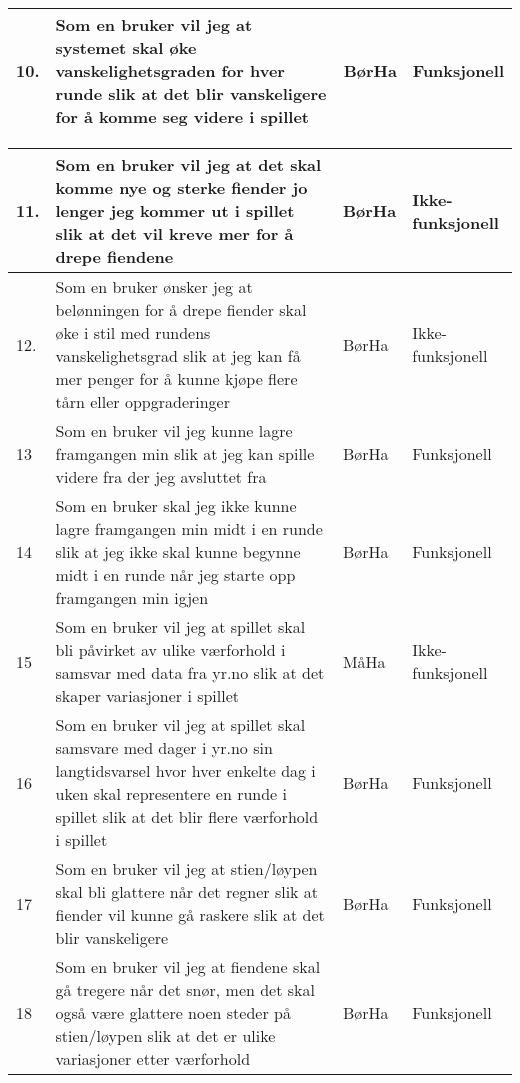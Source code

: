 \documentclass[norsk,a4paper,fontsize=11]{article}
\begin{document}
\begin{center}
\begin{tabular}{|m{} | m{} | m{2cm} | m{3cm} |}
    10. & Som en bruker vil jeg at systemet skal øke vanskelighetsgraden for hver runde slik at det blir vanskeligere for å komme seg videre i spillet & BørHa & Funksjonell \\ \hline
   
    
    
\end{tabular}

\begin{tabular}{|m{} | m{} | m{2cm} | m{3cm} |}
    \hline   
    
   	   11. & Som en bruker vil jeg at det skal komme nye og sterke fiender jo lenger jeg kommer ut i spillet slik at det vil kreve mer for å drepe fiendene & BørHa & Ikke-funksjonell
    \\ \hline
     
    12. & Som en bruker ønsker jeg at belønningen for å drepe fiender skal øke i stil med rundens vanskelighetsgrad slik at jeg kan få mer penger for å kunne kjøpe flere tårn eller oppgraderinger & BørHa & Ikke-funksjonell \\
    \hline
    
    13 & Som en bruker vil jeg kunne lagre framgangen min slik at jeg kan spille videre fra der jeg avsluttet fra & BørHa & Funksjonell \\ \hline
      
    14 & Som en bruker skal jeg ikke kunne lagre framgangen min midt i en runde slik at jeg ikke skal kunne begynne midt i en runde når jeg starte opp framgangen min igjen  & BørHa & Funksjonell \\ \hline
   
    15 & Som en bruker vil jeg at spillet skal bli påvirket av ulike værforhold i samsvar med data fra yr.no slik at det skaper variasjoner i spillet  & MåHa & Ikke-funksjonell \\ \hline
    
    16 & Som en bruker vil jeg at spillet skal samsvare med dager i yr.no sin langtidsvarsel hvor hver enkelte dag i uken skal representere en runde i spillet slik at det blir flere værforhold i spillet & BørHa & Funksjonell \\ \hline
    
    17 & Som en bruker vil jeg at stien/løypen skal bli glattere når det regner slik at fiender vil kunne gå raskere slik at det blir vanskeligere & BørHa & Funksjonell \\ \hline
    
    18 & Som en bruker vil jeg at fiendene skal gå tregere når det snør, men det skal også være glattere noen steder på stien/løypen slik at det er ulike variasjoner etter værforhold & BørHa & Funksjonell \\ \hline
    

\end{tabular}
\end{center}
\end{document}
